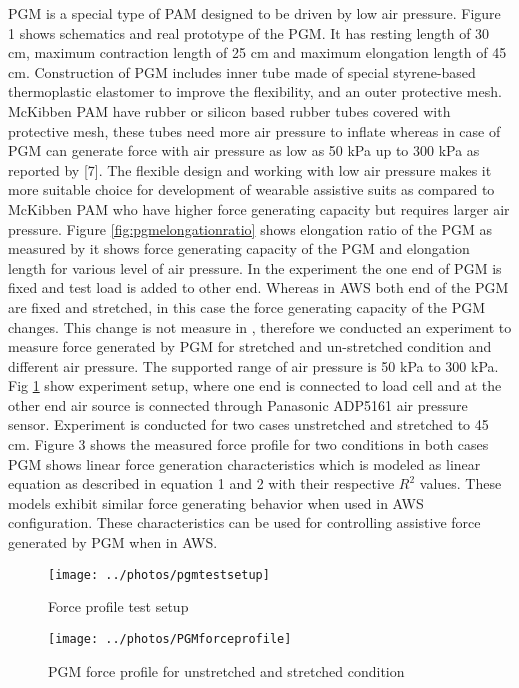 \documentclass[letterpaper, 10 pt, conference]{ieeeconf}  %
\begin{document}
PGM is a special type of PAM designed to be driven by low air pressure. Figure 1 shows schematics and real prototype of the PGM. It has resting length of 30 cm, maximum contraction length of 25 cm and maximum elongation length of 45 cm. Construction of PGM includes inner tube made of special styrene-based thermoplastic elastomer to improve the flexibility, and an outer protective mesh. McKibben PAM have rubber or silicon based rubber tubes covered with protective mesh, these tubes need more air pressure to inflate whereas in case of PGM can generate force with air pressure as low as 50 kPa up to 300 kPa as reported by [7]. The flexible design and working with low air pressure makes it more suitable choice for development of wearable assistive suits as compared to McKibben PAM who have higher force generating capacity but requires larger air pressure. Figure \ref{fig:pgmelongationratio} shows elongation ratio of the PGM as measured by \cite{7} it shows force generating capacity of the PGM and elongation length for various level of air pressure. In the experiment the one end of PGM is fixed and test load is added to other end. Whereas in AWS both end of the PGM are fixed and stretched, in this case the force generating capacity of the PGM changes. This change is not measure in \cite{7}, therefore we conducted an experiment to measure force generated by PGM for stretched and un-stretched condition and different air pressure. The supported range of air pressure is 50 kPa to 300 kPa. Fig \ref{fig:pgmtest} show experiment setup, where one end is connected to load cell and at the other end air source is connected through Panasonic ADP5161 air pressure sensor. Experiment is conducted for two cases unstretched and stretched to 45 cm. Figure 3 shows the measured force profile for two conditions in both cases PGM shows linear force generation characteristics which is modeled as linear equation as described in equation 1 and 2 with their respective $R^2$ values. These models exhibit similar force generating behavior when used in AWS configuration. These characteristics can be used for controlling assistive force generated by PGM when in AWS.

\begin{figure}
	\centering
	\texttt{[image: ../photos/pgmtestsetup]}
	\caption{Force profile test setup}
	\label{fig:pgmtest}
\end{figure}

\begin{figure}
	\centering
	\texttt{[image: ../photos/PGMforceprofile]}
	\caption{PGM force profile for unstretched and stretched condition}
	\label{fig:pgmforceprofile}
\end{figure}
\end{document}
